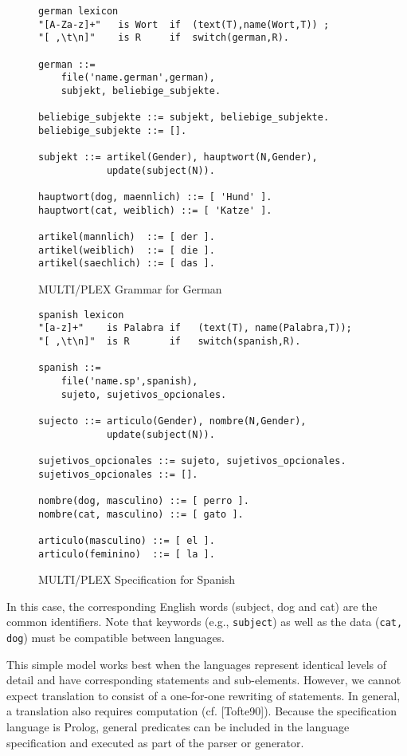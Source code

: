 \begin{figure}[htb]
\begin{verbatim}
german lexicon
"[A-Za-z]+"   is Wort  if  (text(T),name(Wort,T)) ;
"[ ,\t\n]"    is R     if  switch(german,R).

german ::= 
    file('name.german',german),
    subjekt, beliebige_subjekte.

beliebige_subjekte ::= subjekt, beliebige_subjekte.
beliebige_subjekte ::= [].

subjekt ::= artikel(Gender), hauptwort(N,Gender),
            update(subject(N)).

hauptwort(dog, maennlich) ::= [ 'Hund' ].
hauptwort(cat, weiblich) ::= [ 'Katze' ].

artikel(mannlich)  ::= [ der ].
artikel(weiblich)  ::= [ die ].
artikel(saechlich) ::= [ das ].
\end{verbatim}
\caption{MULTI/PLEX Grammar for German}
\end{figure}

\begin{figure}[htb]
\begin{verbatim}
spanish lexicon
"[a-z]+"    is Palabra if   (text(T), name(Palabra,T));
"[ ,\t\n]"  is R       if   switch(spanish,R).

spanish ::= 
    file('name.sp',spanish),
    sujeto, sujetivos_opcionales.

sujecto ::= articulo(Gender), nombre(N,Gender),
            update(subject(N)).

sujetivos_opcionales ::= sujeto, sujetivos_opcionales.
sujetivos_opcionales ::= [].

nombre(dog, masculino) ::= [ perro ].
nombre(cat, masculino) ::= [ gato ].

articulo(masculino) ::= [ el ].
articulo(feminino)  ::= [ la ].
\end{verbatim}
\caption{MULTI/PLEX Specification for Spanish}
\end{figure}

In this case, the corresponding English words
(subject, dog and cat) are the common identifiers.
Note that keywords (e.g., {\tt subject}) as well
as the data ({\tt cat, dog}) must be compatible between languages.

This simple model works best when the languages
represent identical levels of detail and have 
corresponding statements and sub-elements. However,
we cannot expect translation to consist of
a one-for-one rewriting of statements.
In general, a translation also requires
computation (cf. [Tofte90]). Because the specification
language is Prolog, general predicates can be included
in the language specification and executed as part of
the parser or generator.

